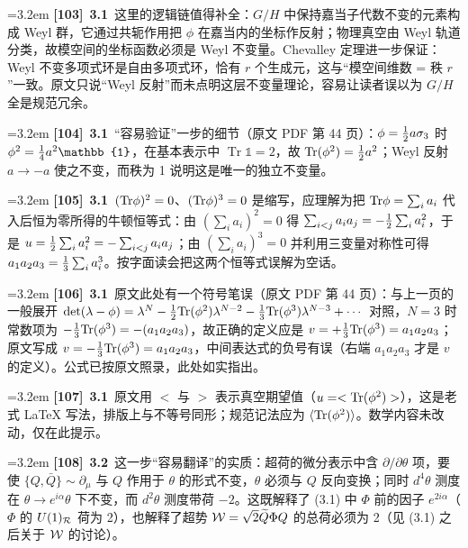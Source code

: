 \par
\par\medskip\noindent\hangindent=3.2em \textbf{[103]}~\textbf{3.1}~这里的逻辑链值得补全：$G/H$ 中保持嘉当子代数不变的元素构成 Weyl 群，它通过共轭作用把 $\phi$ 在嘉当内的坐标作反射；物理真空由 Weyl 轨道分类，故模空间的坐标函数必须是 Weyl 不变量。Chevalley 定理进一步保证：Weyl 不变多项式环是自由多项式环，恰有 $r$ 个生成元，这与“模空间维数 = 秩 $r$”一致。原文只说“Weyl 反射”而未点明这层不变量理论，容易让读者误以为 $G/H$ 全是规范冗余。
\par
\par\medskip\noindent\hangindent=3.2em \textbf{[104]}~\textbf{3.1}~“容易验证”一步的细节（原文 PDF 第 44 页）：$\phi={1\over2}a\sigma_3$ 时 $\phi^2={1\over4}a^2\mathbb{1}$，在基本表示中 $\operatorname{Tr}\mathbb{1}=2$，故 ${\rm Tr}(\phi^2)={1\over2}a^2$；Weyl 反射 $a\to-a$ 使之不变，而秩为 1 说明这是唯一的独立不变量。
\par
\par\medskip\noindent\hangindent=3.2em \textbf{[105]}~\textbf{3.1}~$({\rm Tr}\phi)^2=0$、$({\rm Tr}\phi)^3=0$ 是缩写，应理解为把 ${\rm Tr}\phi=\sum_i a_i$ 代入后恒为零所得的牛顿恒等式：由 $(\sum_i a_i)^2=0$ 得 $\sum_{i<j}a_ia_j=-{1\over2}\sum_i a_i^2$，于是 $u={1\over2}\sum_i a_i^2=-\sum_{i<j}a_ia_j$；由 $(\sum_i a_i)^3=0$ 并利用三变量对称性可得 $a_1a_2a_3={1\over3}\sum_i a_i^3$。按字面读会把这两个恒等式误解为空话。
\par
\par\medskip\noindent\hangindent=3.2em \textbf{[106]}~\textbf{3.1}~原文此处有一个符号笔误（原文 PDF 第 44 页）：与上一页的一般展开 $\det(\lambda-\phi)=\lambda^N-\frac12{\rm Tr}(\phi^2)\lambda^{N-2}-\frac13{\rm Tr}(\phi^3)\lambda^{N-3}+\cdots$ 对照，$N=3$ 时常数项为 $-\frac13{\rm Tr}(\phi^3)=-(a_1a_2a_3)$，故正确的定义应是 $v=+\frac13{\rm Tr}(\phi^3)=a_1a_2a_3$；原文写成 $v=-\frac13{\rm Tr}(\phi^3)=a_1a_2a_3$，中间表达式的负号有误（右端 $a_1a_2a_3$ 才是 $v$ 的定义）。公式已按原文照录，此处如实指出。
\par
\par\medskip\noindent\hangindent=3.2em \textbf{[107]}~\textbf{3.1}~原文用 $<$ 与 $>$ 表示真空期望值（$u=<{\rm Tr}(\phi^2)>$），这是老式 LaTeX 写法，排版上与不等号同形；规范记法应为 $\langle{\rm Tr}(\phi^2)\rangle$。数学内容未改动，仅在此提示。
\par
\par\medskip\noindent\hangindent=3.2em \textbf{[108]}~\textbf{3.2}~这一步“容易翻译”的实质：超荷的微分表示中含 $\partial/\partial\theta$ 项，要使 $\{Q,\bar Q\}\sim\partial_\mu$ 与 $Q$ 作用于 $\theta$ 的形式不变，$\theta$ 必须与 $Q$ 反向变换；同时 $d^4\theta$ 测度在 $\theta\to e^{i\alpha}\theta$ 下不变，而 $d^2\theta$ 测度带荷 $-2$。这既解释了 (3.1) 中 $\Phi$ 前的因子 $e^{2i\alpha}$（$\Phi$ 的 $U(1)_{\cal R}$ 荷为 2），也解释了超势 ${\cal W}=\sqrt{2}\widetilde Q\Phi Q$ 的总荷必须为 2（见 (3.1) 之后关于 ${\cal W}$ 的讨论）。
